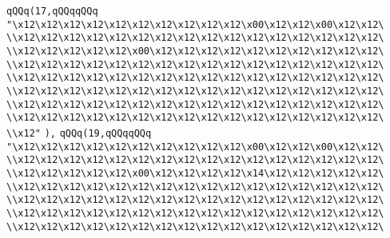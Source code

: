 \verb|qQQq(17,qQQqqQQq|\newline
\verb|"\x12\x12\x12\x12\x12\x12\x12\x12\x12\x12\x00\x12\x12\x00\x12\x12\|\newline
\verb|\\x12\x12\x12\x12\x12\x12\x12\x12\x12\x12\x12\x12\x12\x12\x12\x12\|\newline
\verb|\\x12\x12\x12\x12\x12\x00\x12\x12\x12\x12\x12\x12\x12\x12\x12\x12\|\newline
\verb|\\x12\x12\x12\x12\x12\x12\x12\x12\x12\x12\x12\x12\x12\x12\x12\x12\|\newline
\verb|\\x12\x12\x12\x12\x12\x12\x12\x12\x12\x12\x12\x12\x12\x12\x12\x12\|\newline
\verb|\\x12\x12\x12\x12\x12\x12\x12\x12\x12\x12\x12\x12\x12\x12\x12\x12\|\newline
\verb|\\x12\x12\x12\x12\x12\x12\x12\x12\x12\x12\x12\x12\x12\x12\x12\x12\|\newline
\verb|\\x12\x12\x12\x12\x12\x12\x12\x12\x12\x12\x12\x12\x12\x12\x12\x12\|\newline
\verb|\\x12"|\newline
\verb|),|\newline
\verb|qQQq(19,qQQqqQQq|\newline
\verb|"\x12\x12\x12\x12\x12\x12\x12\x12\x12\x12\x00\x12\x12\x00\x12\x12\|\newline
\verb|\\x12\x12\x12\x12\x12\x12\x12\x12\x12\x12\x12\x12\x12\x12\x12\x12\|\newline
\verb|\\x12\x12\x12\x12\x12\x00\x12\x12\x12\x12\x14\x12\x12\x12\x12\x12\|\newline
\verb|\\x12\x12\x12\x12\x12\x12\x12\x12\x12\x12\x12\x12\x12\x12\x12\x12\|\newline
\verb|\\x12\x12\x12\x12\x12\x12\x12\x12\x12\x12\x12\x12\x12\x12\x12\x12\|\newline
\verb|\\x12\x12\x12\x12\x12\x12\x12\x12\x12\x12\x12\x12\x12\x12\x12\x12\|\newline
\verb|\\x12\x12\x12\x12\x12\x12\x12\x12\x12\x12\x12\x12\x12\x12\x12\x12\|\newline
